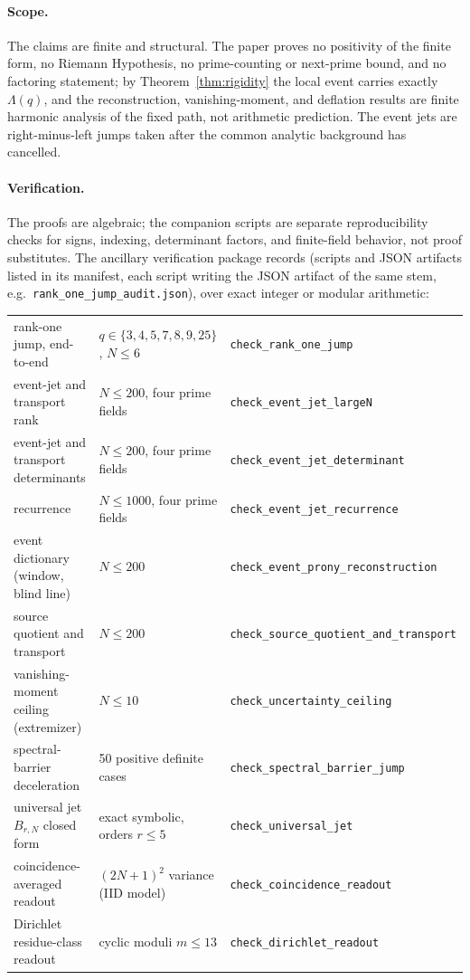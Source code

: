 \documentclass[11pt]{article}
\theoremstyle{plain}
\theoremstyle{definition}
\theoremstyle{remark}
\newcommand{\Lam}{\Lambda}
\begin{document}
\paragraph{Scope.}
The claims are finite and structural. The paper proves no positivity of the
finite form, no Riemann Hypothesis, no prime-counting or next-prime bound, and
no factoring statement; by Theorem~\ref{thm:rigidity} the local event carries
exactly $\Lam(q)$, and the reconstruction, vanishing-moment, and deflation results are
finite harmonic analysis of the fixed path, not arithmetic prediction. The event
jets are right-minus-left jumps taken after the common analytic background has
cancelled.

\paragraph{Verification.}
The proofs are algebraic; the companion scripts are separate reproducibility
checks for
signs, indexing, determinant factors, and finite-field behavior, not proof
substitutes. The ancillary verification package records (scripts and JSON
artifacts listed in its manifest, each script writing the JSON artifact of the
same stem, e.g.\ \texttt{rank\_one\_jump\_audit.json}), over exact integer or
modular arithmetic:
\begin{center}
\footnotesize
\setlength{\tabcolsep}{3.5pt}
\begin{tabular}{lll}
rank-one jump, end-to-end & $q\in\{3,4,5,7,8,9,25\}$, $N\le6$
 & \texttt{check\_rank\_one\_jump}\\
event-jet and transport rank & $N\le200$, four prime fields
 & \texttt{check\_event\_jet\_largeN}\\
event-jet and transport determinants & $N\le200$, four prime fields
 & \texttt{check\_event\_jet\_determinant}\\
recurrence & $N\le1000$, four prime fields
 & \texttt{check\_event\_jet\_recurrence}\\
event dictionary (window, blind line) & $N\le200$
 & \texttt{check\_event\_prony\_reconstruction}\\
source quotient and transport & $N\le200$
 & \texttt{check\_source\_quotient\_and\_transport}\\
vanishing-moment ceiling (extremizer) & $N\le10$
 & \texttt{check\_uncertainty\_ceiling}\\
spectral-barrier deceleration & 50 positive definite cases
 & \texttt{check\_spectral\_barrier\_jump}\\
universal jet $B_{r,N}$ closed form & exact symbolic, orders $r\le5$
 & \texttt{check\_universal\_jet}\\
coincidence-averaged readout & $(2N+1)^2$ variance (IID model)
 & \texttt{check\_coincidence\_readout}\\
Dirichlet residue-class readout & cyclic moduli $m\le13$
 & \texttt{check\_dirichlet\_readout}
\end{tabular}
\end{center}
\end{document}
